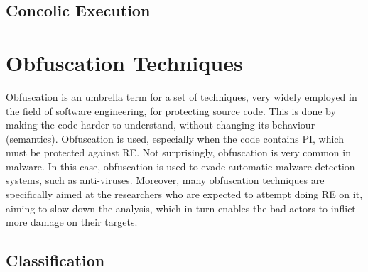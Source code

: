 \subsection{Concolic Execution} %


\section{Obfuscation Techniques}


Obfuscation is an umbrella term for a set of techniques, very widely employed in the field of software engineering, for protecting source code. This is done by making the code harder to understand, without changing its behaviour (semantics). Obfuscation is used, especially when the code contains \gls{PI}, which must be protected against \gls{RE}. Not surprisingly, obfuscation is very common in malware. In this case, obfuscation is used to evade automatic malware detection systems, such as anti-viruses. Moreover, many obfuscation techniques are specifically aimed at the researchers who are expected to attempt doing \gls{RE} on it, aiming to slow down the analysis, which in turn enables the bad actors to inflict more damage on their targets. \cite{zeusvm} 

\subsection{Classification}

